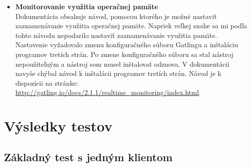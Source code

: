 \documentclass[12pt,oneside,final]{fithesis-utf8}
\begin{document}
\begin{itemize}

\item \textbf{Monitorovanie využitia operačnej pamäte}\\
Dokumentácia obsahuje návod, pomocou ktorého je možné nastaviť zaznamenávanie využitia operačnej pamäte. Napriek veľkej snahe sa mi podľa tohto návodu nepodarilo nastaviť zaznamenávanie využitia pamäte. Nastavenie vyžadovalo zmenu konfiguračného súboru Gatlingu a inštaláciu programov tretích strán. Po zmene konfiguračného súboru sa stal nástroj nepoužiteľným a nástroj som musel inštalovať odznova. V dokumentácii navyše chýbal návod k inštalácii programov tretích strán. Návod je k dispozícii na stránke: \url{http://gatling.io/docs/2.1.1/realtime_monitoring/index.html}.

\end{itemize}

\section{Výsledky testov}

\subsection{Základný test s jedným klientom}
\end{document}
